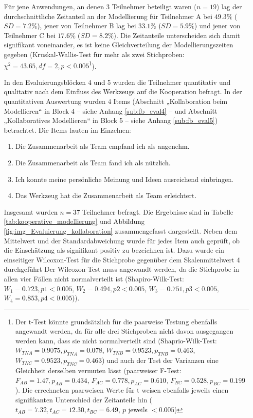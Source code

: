Für jene Anwendungen, an denen 3 Teilnehmer beteiligt waren ($n=19$) lag der durchschnittliche Zeitanteil an der Modellierung für Teilnehmer A bei $49.3\%$ ($SD=7.2\%$), jener von Teilnehmer B lag bei $33.1\%$ ($SD=5.9\%$) und jener von Teilnehmer C bei $17.6\%$ ($SD=8.2\%$). Die Zeitanteile unterscheiden sich damit signifikant voneinander, es ist keine Gleichverteilung der Modellierungszeiten gegeben (Kruskal-Wallis-Test für mehr als zwei Stichproben: $\chi^{2}=43.65, df=2, p<0.005$\footnote{Der t-Test könnte grundsätzlich für die paarweise Testung ebenfalls angewandt werden, da für alle drei Stichproben nicht davon ausgegangen werden kann, dass sie nicht normalverteilt sind (Shaprio-Wilk-Test: $W_{TN A}=0.9075, p_{TN A}=0.078$, $W_{TN B}=0.9523, p_{TN B}=0.463$, $W_{TN C}=0.9523, p_{TN C}=0.463$) und auch der Test der Varianzen eine Gleichheit derselben vermuten lässt (paarweiser F-Test: $F_{AB}=1.47, p_{AB}=0.434$, $F_{AC}=0.778, p_{AC}=0.610$, $F_{BC}=0.528, p_{BC}=0.199$). Die errechneten paarweisen Werte für t weisen ebenfalls jeweils einen signifikanten Unterschied der Zeitanteile hin ($t_{AB}=7.32, t_{AC}=12.30, t_{BC}=6.49$, $p$ jeweils $<0.005$)}).

In den Evaluierungsblöcken 4 und 5 wurden die Teilnehmer quantitativ und qualitativ nach dem Einfluss des Werkzeugs auf die Kooperation befragt. In der quantitativen Auswertung wurden 4 Items (Abschnitt „Kollaboration beim Modellieren“ in Block 4 -- siehe Anhang \ref{sub:fb_eval4} -- und Abschnitt „Kollaboratives Modellieren“ in Block 5 -- siehe Anhang \ref{sub:fb_eval5}) betrachtet. Die Items lauten im Einzelnen:

\begin{enumerate}
	\item Die Zusammenarbeit als Team empfand ich als angenehm.
	\item Die Zusammenarbeit als Team fand ich als nützlich.
	\item Ich konnte meine persönliche Meinung und Ideen ausreichend einbringen.
	\item Das Werkzeug hat die Zusammenarbeit als Team erleichtert.
\end{enumerate}

Insgesamt wurden $n=37$ Teilnehmer befragt. Die Ergebnisse sind in Tabelle \ref{tab:kooperative_modellierung} und Abbildung \ref{fig:img_Evaluierung_kollaboration} zusammengefasst dargestellt. Neben dem Mittelwert und der Standardabweichung wurde für jedes Item auch geprüft, ob die Einschätzung als signifikant positiv zu bezeichnen ist. Dazu wurde ein einseitiger Wilcoxon-Test für die Stichprobe gegenüber dem Skalenmittelwert 4 durchgeführt {Der Wilcoxon-Test muss angewandt werden, da die Stichprobe in allen vier Fällen nicht normalverteilt ist (Shapiro-Wilk-Test: $W_{1}=0.723, p{1}<0.005$, $W_{2}=0.494, p{2}<0.005$, $W_{3}=0.751, p{3}<0.005$, $W_{4}=0.853, p{4}<0.005$)}).

